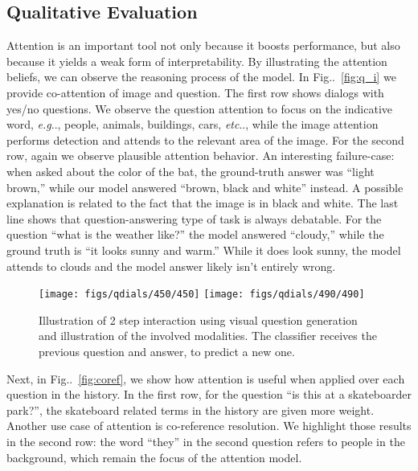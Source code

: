 \documentclass[10pt,twocolumn,letterpaper]{article}
\makeatletter
\def\@onedot{\ifx\@let@token.\else.\null\fi\xspace}
\DeclareRobustCommand\onedot{\futurelet\@let@token\@onedot}
\newcommand{\figref}[1]{Fig\onedot~\ref{#1}}
\def\eg{\emph{e.g}\onedot} \def\Eg{\emph{E.g}\onedot}
\def\etc{\emph{etc}\onedot} \def\vs{\emph{vs}\onedot}
\makeatother
\begin{document}
\subsection{Qualitative Evaluation}
Attention is an important tool not only because it boosts performance, but also because it yields a weak form of interpretability. By illustrating the attention beliefs, we can observe the reasoning process of the model. In \figref{fig:q_i} we provide  co-attention of image and question. The first row shows dialogs with yes/no questions. We observe the question attention to focus on the indicative word, \eg,  people, animals, buildings, cars, \etc, while the image attention performs  detection and attends to the relevant area of the image. For the second row, again we observe plausible attention behavior. An interesting failure-case: when asked about the color of the bat, the ground-truth answer was ``light brown,'' while our model answered ``brown, black and white'' instead. A possible explanation is related to the fact that the image is in black and white. The last line shows that question-answering type of task is always debatable. For the question ``what is the weather like?'' the model answered ``cloudy,'' while the ground truth is ``it looks sunny and warm.'' While it does look sunny, the model attends to clouds and the model answer likely isn't entirely wrong. 



\begin{figure}[t]
\vspace{-0.0cm}
\centering
\texttt{[image: figs/qdials/450/450]}
\texttt{[image: figs/qdials/490/490]}
	\vspace{-0.7cm}
\caption{Illustration of 2 step interaction using  visual question generation and illustration of the involved modalities. The classifier receives the previous question and answer, to predict a new one.}
\label{fig:qdials}
	\vspace{-0.3cm}
\end{figure}



Next, in \figref{fig:coref}, we show how attention is useful when applied over each question in the history. In the first row, for the question ``is this at a skateboarder park?'', the skateboard related terms in the history are given more weight. Another use case of  attention is co-reference resolution.  We highlight those results  in the second row: the word ``they'' in the second question refers to people in the background, which remain the focus of the attention model. 
\end{document}
